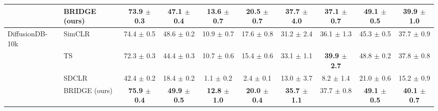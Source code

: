\begin{table}[t]
\begin{adjustbox}{max width=\textwidth}
\begin{tabular}{l l c c c c c c c c}
\rowcolor{blue!10} & BRIDGE (ours) & \textbf{73.9 {\scriptsize$\pm$ 0.3}} & \textbf{47.1 {\scriptsize$\pm$ 0.4}} & \textbf{13.6 {\scriptsize$\pm$ 0.7}} & \textbf{20.5 {\scriptsize$\pm$ 0.7}} & \textbf{37.7 {\scriptsize$\pm$ 4.0}} & \textbf{37.1 {\scriptsize$\pm$ 0.7}} & 49.1 {\scriptsize$\pm$ 0.5} & \textbf{39.9 {\scriptsize$\pm$ 1.0}} \\
\midrule
DiffusionDB-10k & SimCLR & 74.4 {\scriptsize$\pm$ 0.5} & 48.6 {\scriptsize$\pm$ 0.2} & 10.9 {\scriptsize$\pm$ 0.7} & 17.6 {\scriptsize$\pm$ 0.8} & 31.2 {\scriptsize$\pm$ 2.4} & 36.1 {\scriptsize$\pm$ 1.3} & 45.3 {\scriptsize$\pm$ 0.5} & 37.7 {\scriptsize$\pm$ 0.9} \\
 & TS & 72.3 {\scriptsize$\pm$ 0.3} & 44.4 {\scriptsize$\pm$ 0.3} & 10.7 {\scriptsize$\pm$ 0.6} & 15.4 {\scriptsize$\pm$ 0.6} & 33.1 {\scriptsize$\pm$ 1.1} & \textbf{39.9 {\scriptsize$\pm$ 2.7}} & 48.8 {\scriptsize$\pm$ 0.2} & 37.8 {\scriptsize$\pm$ 0.8} \\
 & SDCLR & 42.4 {\scriptsize$\pm$ 0.2} & 18.4 {\scriptsize$\pm$ 0.2} & 1.1 {\scriptsize$\pm$ 0.2} & 2.4 {\scriptsize$\pm$ 0.1} & 13.0 {\scriptsize$\pm$ 3.7} & 8.2 {\scriptsize$\pm$ 1.4} & 21.0 {\scriptsize$\pm$ 0.6} & 15.2 {\scriptsize$\pm$ 0.9} \\
\rowcolor{blue!10} & BRIDGE (ours) & \textbf{75.9 {\scriptsize$\pm$ 0.4}} & \textbf{49.9 {\scriptsize$\pm$ 0.5}} & \textbf{12.8 {\scriptsize$\pm$ 1.0}} & \textbf{20.0 {\scriptsize$\pm$ 0.4}} & \textbf{35.7 {\scriptsize$\pm$ 1.1}} & 37.7 {\scriptsize$\pm$ 0.8} & \textbf{49.1 {\scriptsize$\pm$ 0.5}} & \textbf{40.1 {\scriptsize$\pm$ 0.7}} \\
\bottomrule
\end{tabular}
\end{adjustbox}
\end{table}
